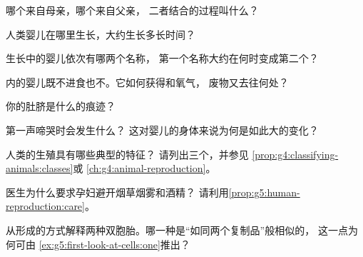 \begin{exercise}[$\star$]\label{exo:g5:human-reproduction:1}
哪个来自母亲，哪个来自父亲，
二者结合的过程叫什么？
\end{exercise}

\begin{exercise}[$\star$]\label{exo:g5:human-reproduction:2}
人类婴儿在哪里生长，大约生长多长时间？
\end{exercise}

\begin{exercise}[$\star$]\label{exo:g5:human-reproduction:3}
生长中的婴儿依次有哪两个名称，
第一个名称大约在何时变成第二个？
\end{exercise}

\begin{exercise}[$\star$]\label{exo:g5:human-reproduction:4}
内的婴儿既不进食也不。它如何获得和氧气，
废物又去往何处？
\end{exercise}

\begin{exercise}[$\star$]\label{exo:g5:human-reproduction:5}
你的肚脐是什么的痕迹？
\end{exercise}

\begin{exercise}[$\star$]\label{exo:g5:human-reproduction:6}
第一声啼哭时会发生什么？
这对婴儿的身体来说为何是如此大的变化？
\end{exercise}

\begin{exercise}[$\star$]\label{exo:g5:human-reproduction:7}
人类的生殖具有哪些典型的特征？
请列出三个，并参见
\cref{prop:g4:classifying-animals:classes}或
\cref{ch:g4:animal-reproduction}。
\end{exercise}

\begin{exercise}[$\star$]\label{exo:g5:human-reproduction:8}
医生为什么要求孕妇避开烟草烟雾和酒精？
请利用\cref{prop:g5:human-reproduction:care}。
\end{exercise}

\begin{exercise}[$\star\star$]\label{exo:g5:human-reproduction:9}
从形成的方式解释两种双胞胎。哪一种是“如同两个复制品”般相似的，
这一点为何可由
\cref{ex:g5:first-look-at-cells:one}推出？
\end{exercise}

